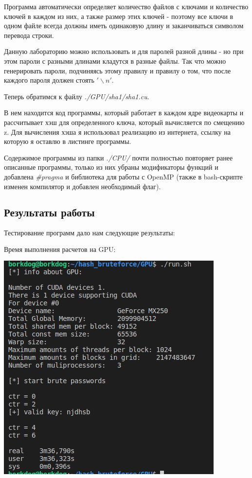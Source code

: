 \documentclass[12pt,a4paper]{scrartcl}
\begin{document}
Программа автоматически определяет количество файлов с ключами и количество ключей в каждом из них, а также размер этих ключей - поэтому все ключи в одном файле всегда должны иметь одинаковую длину и заканчиваться символом перевода строки.

Данную лабораторию можно использовать и для паролей разной длины - но при этом пароли с разными длинами кладутся в разные файлы. Так что можно генерировать пароли, подчиняясь этому правилу и правилу о том, что после каждого пароля должен стоять $'\backslash n'$.


Теперь обратимся к файлу \textit{./GPU/sha1/sha1.cu}.

В нем находится код программы, который работает в каждом ядре видеокарты и рассчитывает хэш для определенного ключа, который вычисляется по смещению z. Для вычисления хэша я использовал реализацию из интернета, ссылку на которую я оставлю в листинге программы.

Содержимое программы из папки \textit{./CPU/} почти полностью повторяет ранее описанные программы, только из них убраны модификаторы функций и добавлена \textit{\#pragma} и библиотека для работы с OpenMP (также в bash-скрипте изменен компилятор и добавлен необходимый флаг).

\subsection{Результаты работы}

Тестирование программ дало нам следующие результаты:

Время выполнения расчетов на GPU:

\begin{center}
	\includegraphics[scale=0.5]{./pictures/GPU.png}
\end{center}
\end{document}
